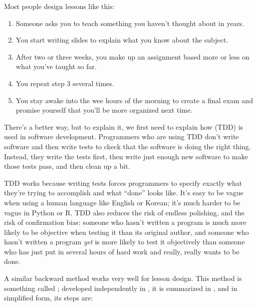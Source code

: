 
Most people design lessons like this:

\begin{enumerate}
\item
  Someone asks you to teach something you haven't thought about in
  years.
\item
  You start writing slides to explain what you know about the subject.
\item
  After two or three weeks, you make up an assignment based more or
  less on what you've taught so far.
\item
  You repeat step 3 several times.
\item
  You stay awake into the wee hours of the morning to create a final
  exam and promise yourself that you'll be more organized next time.
\end{enumerate}

There's a better way, but to explain it, we first need to explain how
 (TDD)
is used in software development. Programmers who are using TDD don't
write software and then write tests to check that the software is
doing the right thing. Instead, they write the tests first, then write
just enough new software to make those tests pass, and then clean up a
bit.

TDD works because writing tests forces programmers to specify exactly
what they're trying to accomplish and what ``done'' looks like. It's
easy to be vague when using a human language like English or Korean;
it's much harder to be vague in Python or R. TDD also reduces the risk
of endless polishing, and the risk of confirmation bias: someone who
hasn't written a program is much more likely to be objective when
testing it than its original author, and someone who hasn't written a
program \emph{yet} is more likely to test it objectively than someone who
has just put in several hours of hard work and really, really wants to
be done.

A similar backward method works very well for lesson design. This
method is something called ;
developed independently in
\cite{Wigg2005,Bigg2011,Fink2013}, it is
summarized in \cite{McTi2013}, and in simplified form, its steps
are:


